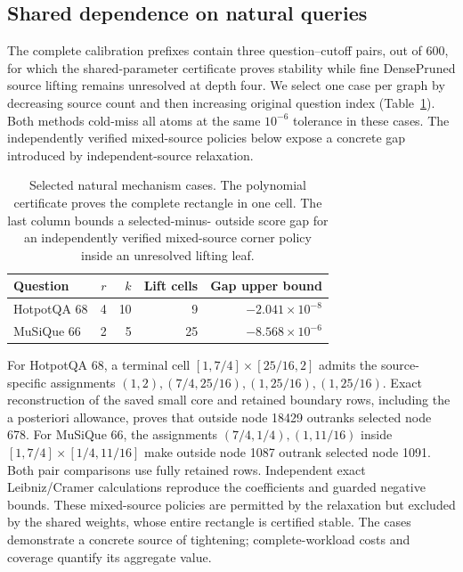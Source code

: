 \subsection{Shared dependence on natural queries}
The complete calibration prefixes contain three question--cutoff pairs,
out of 600, for which the shared-parameter certificate proves stability
while fine DensePruned source lifting remains unresolved at depth four.
We select one case per graph by decreasing source count and then increasing
original question index (Table~\ref{tab:natural-dependence}).
Both methods cold-miss all atoms at the same $10^{-6}$ tolerance in these
cases. The independently verified mixed-source policies below expose a concrete
gap introduced by independent-source relaxation.

\begin{table}[t]\centering\small
\caption{Selected natural mechanism cases. The polynomial certificate proves
the complete rectangle in one cell. The last column bounds a selected-minus-
outside score gap for an independently verified mixed-source corner policy
inside an unresolved lifting leaf.}
\label{tab:natural-dependence}
\begin{tabular}{lrrrr}\toprule
Question & $r$ & $k$ & Lift cells & Gap upper bound\\\midrule
HotpotQA 68 & 4 & 10 & 9 & $-2.041\!\times\!10^{-8}$\\
MuSiQue 66 & 2 & 5 & 25 & $-8.568\!\times\!10^{-6}$\\
\bottomrule\end{tabular}
\end{table}

For HotpotQA 68, a terminal cell
$[1,7/4]\times[25/16,2]$ admits the source-specific assignments
$(1,2),(7/4,25/16),(1,25/16),(1,25/16)$.
Exact reconstruction of the saved small core and retained boundary rows,
including the a posteriori allowance, proves that outside node 18429
outranks selected node 678. For MuSiQue 66, the assignments
$(7/4,1/4),(1,11/16)$ inside
$[1,7/4]\times[1/4,11/16]$ make outside node 1087 outrank selected node 1091.
Both pair comparisons use fully retained rows. Independent exact
Leibniz/Cramer calculations reproduce the coefficients and guarded negative
bounds. These mixed-source policies are permitted by the relaxation but
excluded by the shared weights, whose entire rectangle is certified stable.
The cases demonstrate a concrete source of tightening; complete-workload
costs and coverage quantify its aggregate value.
